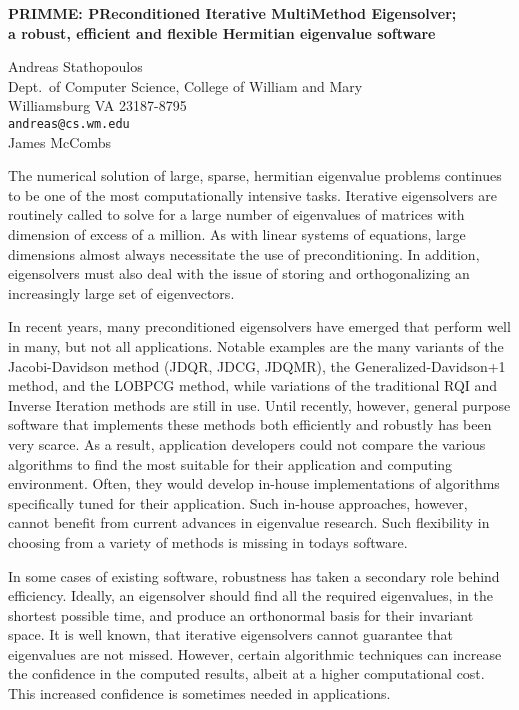 \documentclass{report}
\begin{document}

\begin{center}
{\large
{\bf PRIMME: PReconditioned Iterative MultiMethod Eigensolver; \\
	a robust, efficient and flexible Hermitian eigenvalue software}}

	Andreas Stathopoulos \\
	Dept.~of Computer Science, College of William and Mary \\
	Williamsburg VA 23187-8795 \\
	{\tt andreas@cs.wm.edu} \\
	James McCombs
\end{center}
The numerical solution of large, sparse, hermitian
eigenvalue problems continues to be one of the most
computationally intensive tasks. Iterative eigensolvers are
routinely called to solve for a large number of eigenvalues
of matrices with dimension of excess of a million. As with
linear systems of equations, large dimensions almost always
necessitate the use of preconditioning. In addition,
eigensolvers must also deal with the issue of storing and
orthogonalizing an increasingly large set of eigenvectors.

In recent years, many preconditioned eigensolvers have
emerged that perform well in many, but not all applications.
Notable examples are the many variants of the
Jacobi-Davidson method (JDQR, JDCG, JDQMR), the
Generalized-Davidson+1 method, and the LOBPCG method, while
variations of the traditional RQI and Inverse Iteration
methods are still in use. Until recently, however, general
purpose software that implements these methods both
efficiently and robustly has been very scarce. As a result,
application developers could not compare the various
algorithms to find the most suitable for their application
and computing environment. Often, they would develop
in-house implementations of algorithms specifically tuned
for their application. Such in-house approaches, however,
cannot benefit from current advances in eigenvalue research.
Such flexibility in choosing from a variety of methods is
missing in todays software.

In some cases of existing
software, robustness has taken a secondary role behind
efficiency. Ideally, an eigensolver should find all the
required eigenvalues, in the shortest possible time, and
produce an orthonormal basis for their invariant space. It
is well known, that iterative eigensolvers cannot guarantee
that eigenvalues are not missed. However, certain
algorithmic techniques can increase the confidence in the
computed results, albeit at a higher computational cost.
This increased confidence is sometimes needed in
applications.
\end{document}
